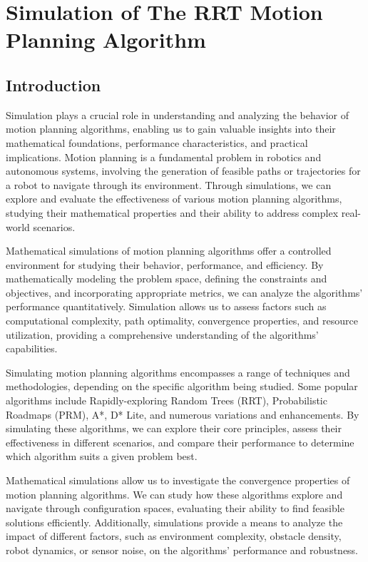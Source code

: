 \chapter{Simulation of The RRT Motion Planning Algorithm}

\section{Introduction}
Simulation plays a crucial role in understanding and analyzing the behavior of motion planning algorithms, enabling us to gain valuable insights into their mathematical foundations, performance characteristics, and practical implications.
Motion planning is a fundamental problem in robotics and autonomous systems, involving the generation of feasible paths or trajectories for a robot to navigate through its environment.
Through simulations, we can explore and evaluate the effectiveness of various motion planning algorithms, studying their mathematical properties and their ability to address complex real-world scenarios.

Mathematical simulations of motion planning algorithms offer a controlled environment for studying their behavior, performance, and efficiency. By mathematically modeling the problem space, defining the constraints and objectives, and incorporating appropriate metrics, we can analyze the algorithms' performance quantitatively.
Simulation allows us to assess factors such as computational complexity, path optimality, convergence properties, and resource utilization, providing a comprehensive understanding of the algorithms' capabilities.

Simulating motion planning algorithms encompasses a range of techniques and methodologies, depending on the specific algorithm being studied.
Some popular algorithms include Rapidly-exploring Random Trees (RRT), Probabilistic Roadmaps (PRM), A*, D* Lite, and numerous variations and enhancements.
By simulating these algorithms, we can explore their core principles, assess their effectiveness in different scenarios, and compare their performance to determine which algorithm suits a given problem best.

Mathematical simulations allow us to investigate the convergence properties of motion planning algorithms.
We can study how these algorithms explore and navigate through configuration spaces, evaluating their ability to find feasible solutions efficiently.
Additionally, simulations provide a means to analyze the impact of different factors, such as environment complexity, obstacle density, robot dynamics, or sensor noise, on the algorithms' performance and robustness.

